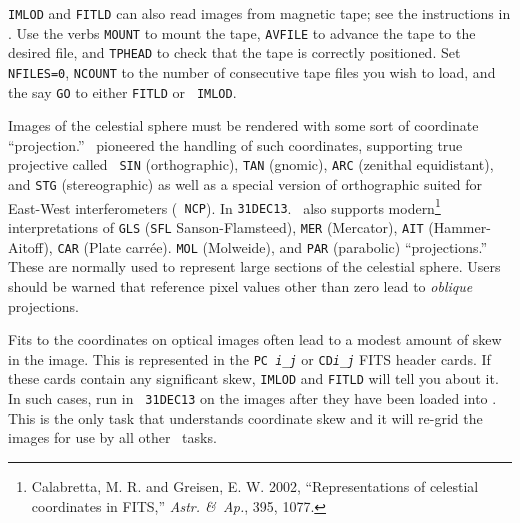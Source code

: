 {\tt IMLOD} and {\tt FITLD} can also read images from magnetic tape;
see the instructions in .  Use the verbs {\tt MOUNT} to
mount the tape, {\tt AVFILE} to advance the tape to the desired file,
and {\tt TPHEAD} to check that the tape is correctly positioned.  Set
{\tt NFILES=0}, {\tt NCOUNT} to the number of consecutive tape files
you wish to load, and the say {\tt GO} to either {\tt FITLD} or {\tt
IMLOD}\@.


Images of the celestial sphere must be rendered with some sort of
coordinate ``projection.''  \AIPS\ pioneered the handling of such
coordinates, supporting true projective  called {\tt
SIN} (orthographic),  {\tt TAN} (gnomic), {\tt ARC} (zenithal
equidistant), and {\tt STG} (stereographic) as well as a special
version of orthographic suited for East-West interferometers ({\tt
NCP})\@.  In {\tt 31DEC13}. \AIPS\ also supports
modern\footnote{Calabretta, M. R. and Greisen, E. W. 2002,
``Representations of celestial coordinates in FITS,'' {\it Astr. \&\
Ap.}, 395, 1077.} interpretations of {\tt GLS} ({\tt SFL}
Sanson-Flamsteed), {\tt MER} (Mercator), {\tt AIT} (Hammer-Aitoff),
{\tt CAR} (Plate carr\'{e}e). {\tt MOL} (Molweide), and {\tt PAR}
(parabolic) ``projections.''  These are normally used to represent
large sections of the celestial sphere.  Users should be warned that
reference pixel values other than zero lead to {\it oblique}
projections.

Fits to the coordinates on optical images often lead to a modest
amount of skew in the image.  This is represented in the {\tt PC{\it
i}\_{\it j}} or {\tt CD{\it i}\_{\it j}} FITS header cards.  If these
cards contain any significant skew, {\tt IMLOD} and {\tt FITLD} will
tell you about it.  In such cases, run {\tt \tndx{DSKEW}} in {\tt
31DEC13} on the images after they have been loaded into \AIPS\@.  This
is the only task that understands coordinate skew and it will re-grid
the images for use by all other \AIPS\ tasks.


